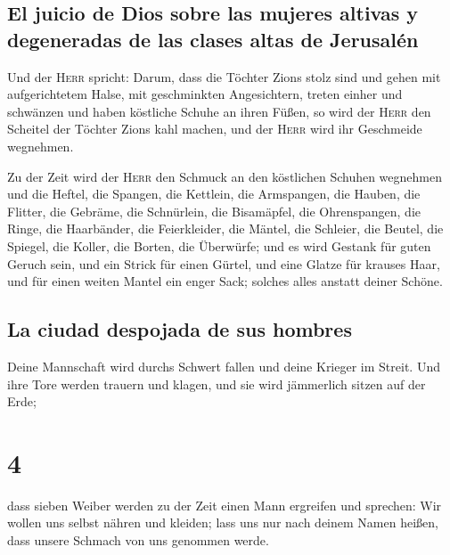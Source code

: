 \hypertarget{el-juicio-de-dios-sobre-las-mujeres-altivas-y-degeneradas-de-las-clases-altas-de-jerusaluxe9n}{%
\subsection{El juicio de Dios sobre las mujeres altivas y degeneradas de
las clases altas de
Jerusalén}\label{el-juicio-de-dios-sobre-las-mujeres-altivas-y-degeneradas-de-las-clases-altas-de-jerusaluxe9n}}

 Und der \textsc{Herr} spricht: Darum, dass die Töchter
Zions stolz sind und gehen mit aufgerichtetem Halse, mit geschminkten
Angesichtern, treten einher und schwänzen und haben köstliche Schuhe an
ihren Füßen,  so wird der \textsc{Herr} den Scheitel der
Töchter Zions kahl machen, und der \textsc{Herr} wird ihr Geschmeide
wegnehmen.

 Zu der Zeit wird der \textsc{Herr} den Schmuck an den
köstlichen Schuhen wegnehmen und die Heftel, die Spangen,
 die Kettlein, die Armspangen, die Hauben,
 die Flitter, die Gebräme, die Schnürlein, die
Bisamäpfel, die Ohrenspangen,  die Ringe, die Haarbänder,
 die Feierkleider, die Mäntel, die Schleier, die Beutel,
 die Spiegel, die Koller, die Borten, die Überwürfe;
 und es wird Gestank für guten Geruch sein, und ein
Strick für einen Gürtel, und eine Glatze für krauses Haar, und für einen
weiten Mantel ein enger Sack; solches alles anstatt deiner Schöne.

\hypertarget{la-ciudad-despojada-de-sus-hombres}{%
\subsection{La ciudad despojada de sus
hombres}\label{la-ciudad-despojada-de-sus-hombres}}

 Deine Mannschaft wird durchs Schwert fallen und deine
Krieger im Streit.  Und ihre Tore werden trauern und
klagen, und sie wird jämmerlich sitzen auf der Erde;

\hypertarget{section-3}{%
\section{4}\label{section-3}}

 dass sieben Weiber werden zu der Zeit einen Mann
ergreifen und sprechen: Wir wollen uns selbst nähren und kleiden; lass
uns nur nach deinem Namen heißen, dass unsere Schmach von uns genommen
werde.

